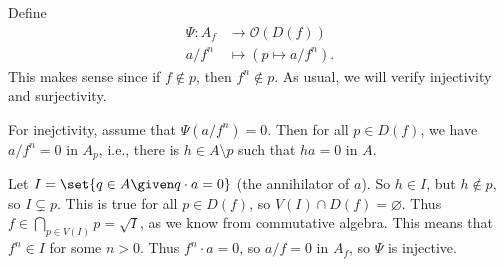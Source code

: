 Define
\begin{align*}
	\Psi\colon A_f&\to \mathcal{O}(D(f))\\
	a/f^n&\mapsto (p\mapsto a/f^n).
\end{align*}
This makes sense since if $f\notin p$, then $f^n\notin p$.
As usual, we will verify injectivity and surjectivity.

For inejctivity, assume that $\Psi(a/f^n) = 0$. Then for all $p \in D(f)$, we have
$a/f^n = 0$ in $A_p$, i.e., there is  $h \in A\setminus p$ such that $ha = 0$ in $A$.

Let $I = \set{q \in A\given q\cdot a = 0}$ (the annihilator of $a$).
So $h \in I$, but $h \notin p$, so $I\subsetneq p$.
This is true for all $p \in D(f)$, so $V(I)\cap D(f) = \varnothing$. Thus
$f \in \bigcap_{p \in V(I)}p = \sqrt{I}$, as we know from commutative algebra.
This means that $f^n \in I$ for some $n>0$. Thus $f^n\cdot a = 0$, so
$a/f = 0$ in $A_f$, so $\Psi$ is injective.
